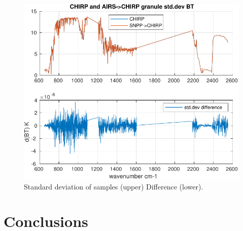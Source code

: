\documentclass[11pt]{article}
\begin{document}
\begin{figure}[htbp]
\centering
\includegraphics[width=.9\linewidth]{./figs/2020d001g235_chirp_aq_bt_spectrum_std.pdf}
\caption{\label{fig:org8647f29}
Standard deviation of samples (upper) Difference (lower).}
\end{figure}


\section{Conclusions}
\label{sec:org3c42b5a}
\end{document}
